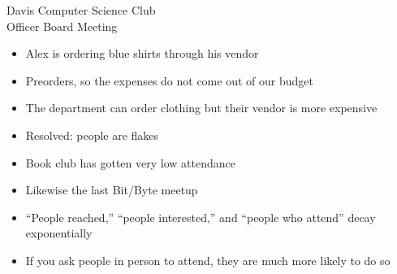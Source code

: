 \documentclass{article}
\begin{document}
\begin{Minutes}{Davis Computer Science Club\\Officer Board Meeting}
\begin{itemize}
\item Alex is ordering blue shirts through his vendor
\item Preorders, so the expenses do not come out of our budget
\item The department can order clothing but their vendor is more expensive
\end{itemize}

\begin{itemize}
\item Resolved: people are flakes
\item Book club has gotten very low attendance
\item Likewise the last Bit/Byte meetup
\item ``People reached,'' ``people interested,'' and ``people who attend'' decay exponentially
\item If you ask people in person to attend, they are much more likely to do so
\end{itemize}
\thispagestyle{creditfooter}
\end{Minutes}
\end{document}
